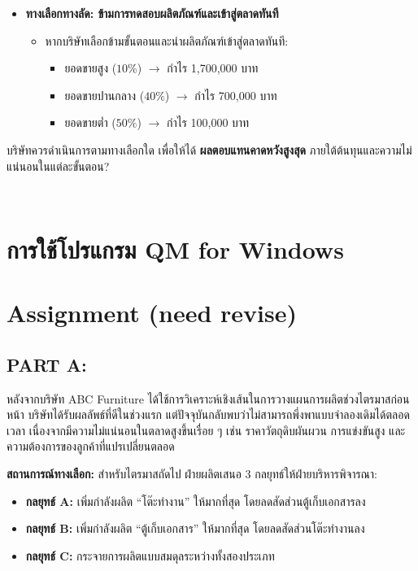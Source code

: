 \begin{example}
\begin{itemize}
    \item \textbf{ทางเลือกทางลัด: ข้ามการทดสอบผลิตภัณฑ์และเข้าสู่ตลาดทันที}
    \begin{itemize}
        \item หากบริษัทเลือกข้ามขั้นตอนและนำผลิตภัณฑ์เข้าสู่ตลาดทันที:
        \begin{itemize}
            \item ยอดขายสูง (\(10\%\)) $\rightarrow$ กำไร 1,700,000 บาท
            \item ยอดขายปานกลาง (\(40\%\)) $\rightarrow$ กำไร 700,000 บาท
            \item ยอดขายต่ำ (\(50\%\)) $\rightarrow$ กำไร 100,000 บาท
        \end{itemize}
    \end{itemize}
\end{itemize}

\medskip
\noindent
บริษัทควรดำเนินการตามทางเลือกใด เพื่อให้ได้ \textbf{ผลตอบแทนคาดหวังสูงสุด} ภายใต้ต้นทุนและความไม่แน่นอนในแต่ละขั้นตอน?

  
\end{example}
\newpage~
\newpage
\section{การใช้โปรแกรม QM for Windows}
\newpage
\section*{Assignment (need revise)}
\subsection*{PART A:}
หลังจากบริษัท ABC Furniture ได้ใช้การวิเคราะห์เชิงเส้นในการวางแผนการผลิตช่วงไตรมาสก่อนหน้า  
บริษัทได้รับผลลัพธ์ที่ดีในช่วงแรก แต่ปัจจุบันกลับพบว่าไม่สามารถพึ่งพาแบบจำลองเดิมได้ตลอดเวลา  
เนื่องจากมีความไม่แน่นอนในตลาดสูงขึ้นเรื่อย ๆ เช่น ราคาวัตถุดิบผันผวน การแข่งขันสูง และความต้องการของลูกค้าที่แปรเปลี่ยนตลอด

\medskip
\noindent
\textbf{สถานการณ์ทางเลือก:} สำหรับไตรมาสถัดไป ฝ่ายผลิตเสนอ 3 กลยุทธ์ให้ฝ่ายบริหารพิจารณา:

\begin{itemize}
    \item \textbf{กลยุทธ์ A:} เพิ่มกำลังผลิต “โต๊ะทำงาน” ให้มากที่สุด โดยลดสัดส่วนตู้เก็บเอกสารลง
    \item \textbf{กลยุทธ์ B:} เพิ่มกำลังผลิต “ตู้เก็บเอกสาร” ให้มากที่สุด โดยลดสัดส่วนโต๊ะทำงานลง
    \item \textbf{กลยุทธ์ C:} กระจายการผลิตแบบสมดุลระหว่างทั้งสองประเภท
\end{itemize}

